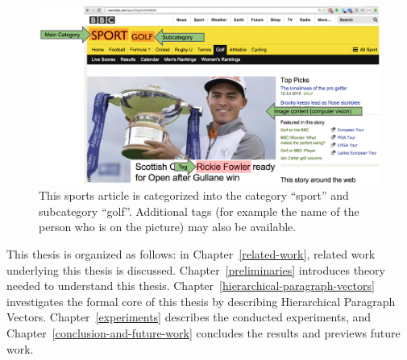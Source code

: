 \begin{figure}
	\centering
	\includegraphics[width=1.0\textwidth]{1introduction/hierarchies-sports.png}
	\caption[Caption for LOF]{This sports article is categorized into the category ``sport'' and subcategory ``golf''. Additional tags (for example the name of the person who is on the picture) may also be available.\footnotemark}
	\label{fig:1:hierarchies-sports}
\end{figure}

This thesis is organized as follows: in Chapter~\ref{related-work}, related work underlying this thesis is discussed. Chapter~\ref{preliminaries} introduces theory needed to understand this thesis. Chapter~\ref{hierarchical-paragraph-vectors} investigates the formal core of this thesis by describing Hierarchical Paragraph Vectors. Chapter~\ref{experiments} describes the conducted experiments, and Chapter~\ref{conclusion-and-future-work} concludes the results and previews future work.

\newpage

